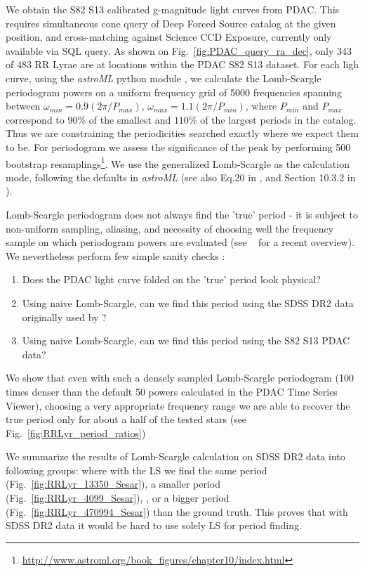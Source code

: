 \documentclass[DM,lsstdraft,toc]{lsstdoc}
\begin{document}
 We obtain the S82 S13 calibrated g-magnitude light curves from PDAC. This requires simultaneous cone query of Deep Forced Source catalog at the given position, and cross-matching against Science CCD Exposure, currently only available via SQL query.  As shown on Fig.~\ref{fig:PDAC_query_ra_dec}, only 343 of 483 RR Lyrae are at locations within the PDAC S82 S13 dataset. For each ligh curve, using the {\it astroML} python module \citep{VanderPlas:6382200}, we calculate the Lomb-Scargle periodogram powers on a uniform frequency grid of 5000 frequencies spanning between $\omega_{min} = 0.9 ( 2 \pi / P_{max})$, $\omega_{max} = 1.1 ( 2 \pi / P_{min})$, where  $P_{min}$ and $P_{max}$ correspond to $90 \%$ of the smallest and $110\%$ of the largest periods in the catalog. Thus we are constraining the periodicities searched exactly where we expect them to be. For periodogram we assess  the significance of the peak by performing 500 bootstrap resamplings\footnote{\url{http://www.astroml.org/book\_figures/chapter10/index.html}}. We use the generalized Lomb-Scargle as the calculation  mode,  following the defaults in {\it astroML} (see also Eq.20 in \citep{2009A&A...496..577Z}, and Section 10.3.2 in \citep{2014sdmm.book.....I}).


Lomb-Scargle periodogram does not always find the 'true' period - it is subject to non-uniform sampling,  aliasing,  and necessity of choosing well the frequency sample on which periodogram powers are evaluated (see ~\cite{2017arXiv170309824V} for a recent overview). We nevertheless perform few simple sanity checks :
\begin{enumerate}
  \item  Does the PDAC light curve folded on the 'true' period look physical?
  \item  Using naive Lomb-Scargle, can we find this period using the SDSS DR2 data originally used by \citep{2010ApJ...708..717S}?
  \item  Using naive Lomb-Scargle, can we find this period using the S82 S13 PDAC data?
\end{enumerate}


We show that even with such a densely sampled  Lomb-Scargle periodogram (100 times denser than the default 50 powers calculated in the PDAC Time Series Viewer), choosing a very appropriate frequency range we are able to recover the true period only for about a half of the tested stars (see Fig.~\ref{fig:RRLyr_period_ratios})

We summarize the results of Lomb-Scargle calculation on SDSS DR2 data into following groups: where with the LS we find the same period (Fig.~\ref{fig:RRLyr_13350_Sesar}), a smaller period (Fig.~\ref{fig:RRLyr_4099_Sesar}), , or a bigger period  (Fig.~\ref{fig:RRLyr_470994_Sesar}) than the ground truth. This proves that with SDSS DR2 data it would be hard to use solely LS for period finding.
\end{document}
